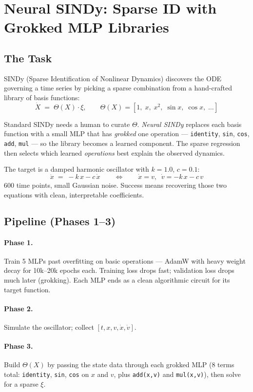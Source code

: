 \section{Neural SINDy: Sparse ID with Grokked MLP Libraries}

\subsection*{The Task}

SINDy (Sparse Identification of Nonlinear Dynamics) discovers the ODE
governing a time series by picking a sparse combination from a
hand-crafted library of basis functions:
\[
    \dot{X} \;=\; \Theta(X) \cdot \xi, \qquad
    \Theta(X) = [1,\; x,\; x^2,\; \sin x,\; \cos x,\; \ldots]
\]

Standard SINDy needs a human to curate $\Theta$. \emph{Neural SINDy}
replaces each basis function with a small MLP that has \emph{grokked}
one operation --- \texttt{identity}, \texttt{sin}, \texttt{cos},
\texttt{add}, \texttt{mul} --- so the library becomes a learned
component. The sparse regression then selects which learned
\emph{operations} best explain the observed dynamics.

The target is a damped harmonic oscillator with $k=1.0$, $c=0.1$:
\[
    \ddot{x} \;=\; -k\,x - c\,\dot{x}
    \qquad \Longleftrightarrow \qquad
    \dot{x} = v, \;\; \dot{v} = -k\,x - c\,v
\]
600 time points, small Gaussian noise. Success means recovering those
two equations with clean, interpretable coefficients.

\subsection*{Pipeline (Phases 1--3)}

\paragraph{Phase 1.} Train 5 MLPs past overfitting on basic operations
--- AdamW with heavy weight decay for 10k--20k epochs each. Training
loss drops fast; validation loss drops much later (grokking). Each MLP
ends as a clean algorithmic circuit for its target function.

\paragraph{Phase 2.} Simulate the oscillator; collect
$[t, x, v, \dot{x}, \dot{v}]$.

\paragraph{Phase 3.} Build $\Theta(X)$ by passing the state data
through each grokked MLP (8 terms total: \texttt{identity}, \texttt{sin},
\texttt{cos} on $x$ and $v$, plus \texttt{add(x,v)} and
\texttt{mul(x,v)}), then solve for a sparse $\xi$.

